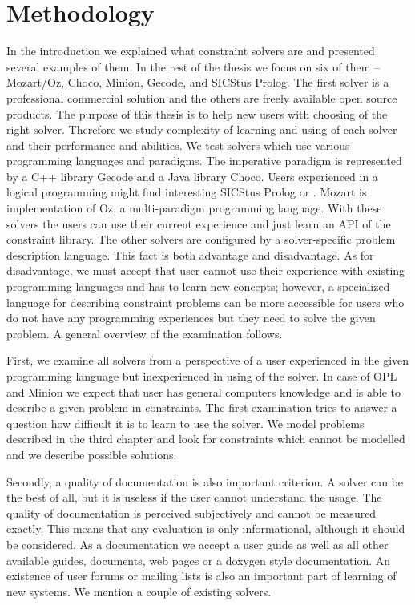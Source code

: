 \chapter{Methodology}
\thispagestyle{myheadings}

In the introduction we explained what constraint solvers are and presented several 
examples of them. In the rest of the thesis we focus on six of them -- Mozart/Oz, 
Choco, Minion, Gecode, \eclipse and SICStus Prolog. The first solver is a 
professional commercial solution and the others are freely available open source 
products. The purpose of this thesis is to help new users with choosing of the right solver. 
Therefore we study complexity of learning and using of each solver and their 
performance and abilities. We test solvers which use various programming languages 
and paradigms. The imperative paradigm is represented by a C++ library Gecode and a Java 
library Choco. Users experienced in a logical programming might find interesting 
SICStus Prolog or \eclipse. Mozart is implementation of Oz, a multi-paradigm 
programming language. With these solvers the users can use their current experience and 
just learn an API of the constraint library. The other solvers are configured by 
a solver-specific problem description language. This fact is both advantage and disadvantage. 
As for disadvantage, we must accept that user cannot use their experience with 
existing programming languages and has to learn new concepts; however, a specialized 
language for describing constraint problems can be more accessible for users who 
do not have any programming experiences but they need to solve the given problem.
A general overview of the examination follows.

First, we examine all solvers from a perspective of a user experienced in the given 
programming language but inexperienced in using of the solver. In case of OPL 
and Minion we expect that user has general computers knowledge and is able 
to describe a given problem in constraints. The first examination tries to answer 
a question how difficult it is to learn to use the solver. We model problems 
described in the third chapter and look for constraints which cannot be modelled 
and we describe possible solutions. 

Secondly, a quality of documentation is also important criterion. A solver can be 
the best of all, but it is useless if the user cannot understand the usage. 
The quality of documentation is perceived subjectively and cannot be measured 
exactly. This means that any evaluation is only informational, although it should be 
considered. As a documentation we accept a user guide as well as all other available 
guides, documents, web pages or a doxygen style documentation. An existence of user 
forums or mailing lists is also an important part of learning of new systems. We 
mention a couple of existing solvers. 

